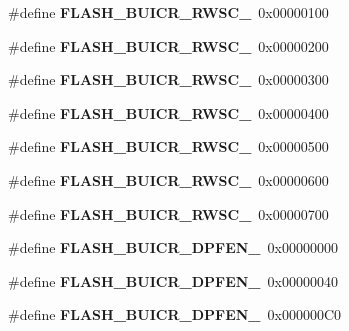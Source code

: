 \begin{DoxyCompactItemize}
\item 
\mbox{\label{reg-defs_8h_a5d114cb7ade32b95f5c8bc7cdd59a2c1}} 
\#define {\bfseries F\+L\+A\+S\+H\+\_\+\+B\+U\+I\+C\+R\+\_\+\+R\+W\+S\+C\+\_}~0x00000100
\item 
\mbox{\label{reg-defs_8h_a787401fefd615bdf9ac63f70ed3c2d1c}} 
\#define {\bfseries F\+L\+A\+S\+H\+\_\+\+B\+U\+I\+C\+R\+\_\+\+R\+W\+S\+C\+\_}~0x00000200
\item 
\mbox{\label{reg-defs_8h_a7f0389e0347997bbab061468ba2a5d32}} 
\#define {\bfseries F\+L\+A\+S\+H\+\_\+\+B\+U\+I\+C\+R\+\_\+\+R\+W\+S\+C\+\_}~0x00000300
\item 
\mbox{\label{reg-defs_8h_ab82d735a079dc8cb7283a5931b7a8b11}} 
\#define {\bfseries F\+L\+A\+S\+H\+\_\+\+B\+U\+I\+C\+R\+\_\+\+R\+W\+S\+C\+\_}~0x00000400
\item 
\mbox{\label{reg-defs_8h_a8ca4516129534efb930d5fd25d688320}} 
\#define {\bfseries F\+L\+A\+S\+H\+\_\+\+B\+U\+I\+C\+R\+\_\+\+R\+W\+S\+C\+\_}~0x00000500
\item 
\mbox{\label{reg-defs_8h_a6d8c4d0c253a7a29c77004508d069ff0}} 
\#define {\bfseries F\+L\+A\+S\+H\+\_\+\+B\+U\+I\+C\+R\+\_\+\+R\+W\+S\+C\+\_}~0x00000600
\item 
\mbox{\label{reg-defs_8h_a6bb084714ef62dbe3f515b91ac66effc}} 
\#define {\bfseries F\+L\+A\+S\+H\+\_\+\+B\+U\+I\+C\+R\+\_\+\+R\+W\+S\+C\+\_}~0x00000700
\item 
\mbox{\label{reg-defs_8h_a1c83f43d1f405970473d9336ce849663}} 
\#define {\bfseries F\+L\+A\+S\+H\+\_\+\+B\+U\+I\+C\+R\+\_\+\+D\+P\+F\+E\+N\+\_}~0x00000000
\item 
\mbox{\label{reg-defs_8h_a7701bc7164dfc4a9d2db00ab8ba49a5c}} 
\#define {\bfseries F\+L\+A\+S\+H\+\_\+\+B\+U\+I\+C\+R\+\_\+\+D\+P\+F\+E\+N\+\_}~0x00000040
\item 
\mbox{\label{reg-defs_8h_a2e2ad92b191e4e8ccfc7bacd0d35a6db}} 
\#define {\bfseries F\+L\+A\+S\+H\+\_\+\+B\+U\+I\+C\+R\+\_\+\+D\+P\+F\+E\+N\+\_}~0x000000\+C0

\end{DoxyCompactItemize}
